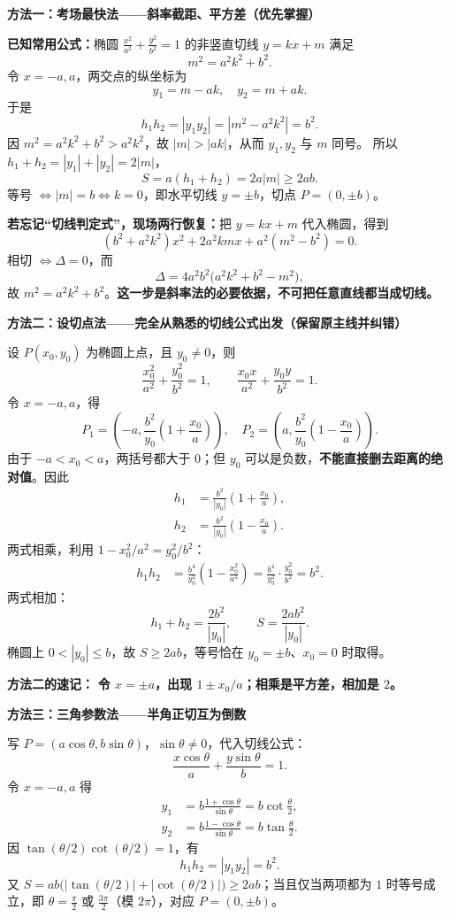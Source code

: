 \begin{proofbox}
\textbf{\textcolor{CProof}{方法一：考场最快法——斜率截距、平方差（优先掌握）}}

\textbf{已知常用公式：}椭圆 $\frac{x^2}{a^2}+\frac{y^2}{b^2}=1$ 的非竖直切线 $y=kx+m$ 满足
\[
\boxed{m^2=a^2k^2+b^2}.
\]
令 $x=-a,a$，两交点的纵坐标为
\[
y_1=m-ak,\quad y_2=m+ak.
\]
于是
\[
\boxed{h_1h_2=|y_1y_2|=|m^2-a^2k^2|=b^2.}
\]
因 $m^2=a^2k^2+b^2>a^2k^2$，故 $|m|>|ak|$，从而 $y_1,y_2$ 与 $m$ 同号。
所以 $h_1+h_2=|y_1|+|y_2|=2|m|$，
\[
S=a(h_1+h_2)=2a|m|\ge2ab.
\]
等号 $\Longleftrightarrow |m|=b\Longleftrightarrow k=0$，即水平切线 $y=\pm b$，切点 $P=(0,\pm b)$。

\textbf{若忘记“切线判定式”，现场两行恢复：}把 $y=kx+m$ 代入椭圆，得到
\[
(b^2+a^2k^2)x^2+2a^2kmx+a^2(m^2-b^2)=0.
\]
相切 $\Longleftrightarrow\Delta=0$，而
\[
\Delta=4a^2b^2\bigl(a^2k^2+b^2-m^2\bigr),
\]
故 $m^2=a^2k^2+b^2$。\textbf{这一步是斜率法的必要依据，不可把任意直线都当成切线。}

\medskip
\textbf{\textcolor{CProof}{方法二：设切点法——完全从熟悉的切线公式出发（保留原主线并纠错）}}

设 $P(x_0,y_0)$ 为椭圆上点，且 $y_0\ne0$，则
\[
\frac{x_0^2}{a^2}+\frac{y_0^2}{b^2}=1,\qquad
\frac{x_0x}{a^2}+\frac{y_0y}{b^2}=1.
\]
令 $x=-a,a$，得
\[
P_1=\left(-a,\frac{b^2}{y_0}\left(1+\frac{x_0}{a}\right)\right),\quad
P_2=\left(a,\frac{b^2}{y_0}\left(1-\frac{x_0}{a}\right)\right).
\]
由于 $-a<x_0<a$，两括号都大于 $0$；但 $y_0$ 可以是负数，\textbf{不能直接删去距离的绝对值}。因此
\[
\begin{aligned}
h_1&=\frac{b^2}{|y_0|}\left(1+\frac{x_0}{a}\right),\\
h_2&=\frac{b^2}{|y_0|}\left(1-\frac{x_0}{a}\right).
\end{aligned}
\]
两式相乘，利用 $1-x_0^2/a^2=y_0^2/b^2$：
\[
\begin{aligned}
h_1h_2
&=\frac{b^4}{y_0^2}\left(1-\frac{x_0^2}{a^2}\right)
=\frac{b^4}{y_0^2}\cdot\frac{y_0^2}{b^2}
=\boxed{b^2}.
\end{aligned}
\]
两式相加：
\[
h_1+h_2=\frac{2b^2}{|y_0|},\qquad
\boxed{S=\frac{2ab^2}{|y_0|}}.
\]
椭圆上 $0<|y_0|\le b$，故 $S\ge2ab$，等号恰在 $y_0=\pm b$、$x_0=0$ 时取得。

\textbf{方法二的速记：} \textbf{令 $x=\pm a$，出现 $1\pm x_0/a$；相乘是平方差，相加是 $2$。}

\medskip
\textbf{\textcolor{CProof}{方法三：三角参数法——半角正切互为倒数}}

写 $P=(a\cos\theta,b\sin\theta)$，$\sin\theta\ne0$，代入切线公式：
\[
\frac{x\cos\theta}{a}+\frac{y\sin\theta}{b}=1.
\]
令 $x=-a,a$ 得
\[
\begin{aligned}
y_1&=b\frac{1+\cos\theta}{\sin\theta}
=b\cot\frac{\theta}{2},\\
y_2&=b\frac{1-\cos\theta}{\sin\theta}
=b\tan\frac{\theta}{2}.
\end{aligned}
\]
因 $\tan(\theta/2)\cot(\theta/2)=1$，有
\[
h_1h_2=|y_1y_2|=b^2.
\]
又 $S=ab\bigl(|\tan(\theta/2)|+|\cot(\theta/2)|\bigr)\ge2ab$；当且仅当两项都为 $1$ 时等号成立，即 $\theta=\frac\pi2$ 或 $\frac{3\pi}{2}$（模 $2\pi$），对应 $P=(0,\pm b)$。


\end{proofbox}
